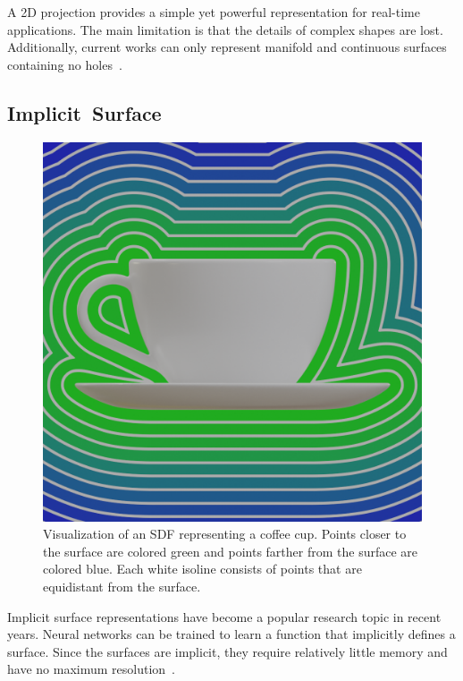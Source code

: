 A 2D projection provides a simple yet powerful representation for real-time applications. The main limitation is that the details of complex shapes are lost. Additionally, current works can only represent manifold and continuous surfaces containing no holes~\cite{Sinha2017}.

\newpage


\subsection{Implicit~Surface}
\label{subsec:implicit_surface}

\begin{figure}[ht]
	\centering
	\includegraphics[scale=0.2]{Images/SDF Cup}
	\caption{Visualization of an SDF representing a coffee cup. Points closer to the surface are colored green and points farther from the surface are colored blue. Each white isoline consists of points that are equidistant from the surface.}
	\label{fig:sdf_cup}
\end{figure}

Implicit surface representations have become a popular research topic in recent years. Neural networks can be trained to learn a function that implicitly defines a surface. Since the surfaces are implicit, they require relatively little memory and have no maximum resolution~\cite{Xiao2020}.

